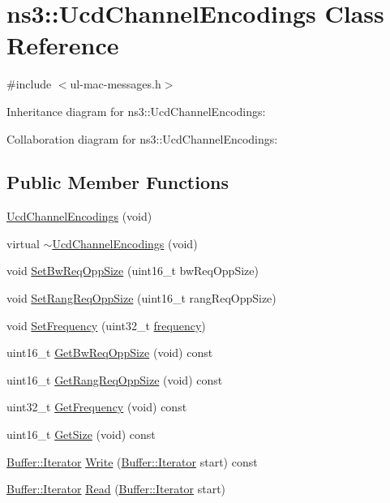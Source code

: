 \hypertarget{classns3_1_1UcdChannelEncodings}{}\section{ns3\+:\+:Ucd\+Channel\+Encodings Class Reference}
\label{classns3_1_1UcdChannelEncodings}


{\ttfamily \#include $<$ul-\/mac-\/messages.\+h$>$}



Inheritance diagram for ns3\+:\+:Ucd\+Channel\+Encodings\+:


Collaboration diagram for ns3\+:\+:Ucd\+Channel\+Encodings\+:
\subsection*{Public Member Functions}
\begin{DoxyCompactItemize}
\item 
\hyperlink{classns3_1_1UcdChannelEncodings_a4f117c27f4a95ee1a3256cb7da02eb64}{Ucd\+Channel\+Encodings} (void)
\item 
virtual \hyperlink{classns3_1_1UcdChannelEncodings_ac2d9ffeae54ebe25d204a858124b40b0}{$\sim$\+Ucd\+Channel\+Encodings} (void)
\item 
void \hyperlink{classns3_1_1UcdChannelEncodings_abf807ce9eab9d2320950a2519049b989}{Set\+Bw\+Req\+Opp\+Size} (uint16\+\_\+t bw\+Req\+Opp\+Size)
\item 
void \hyperlink{classns3_1_1UcdChannelEncodings_a047c31196baed670a0057935d5736205}{Set\+Rang\+Req\+Opp\+Size} (uint16\+\_\+t rang\+Req\+Opp\+Size)
\item 
void \hyperlink{classns3_1_1UcdChannelEncodings_a05720d5a54aec62a0efd537409ecce83}{Set\+Frequency} (uint32\+\_\+t \hyperlink{mmwave_2model_2fading-traces_2fading__trace__generator_8m_a09045328d6d7e16aa4013f526cc6993d}{frequency})
\item 
uint16\+\_\+t \hyperlink{classns3_1_1UcdChannelEncodings_a192a6f870bc66fab3fcb0fa79ea2dd8b}{Get\+Bw\+Req\+Opp\+Size} (void) const 
\item 
uint16\+\_\+t \hyperlink{classns3_1_1UcdChannelEncodings_a27d75585bcae3837f08a4220f1d5eba4}{Get\+Rang\+Req\+Opp\+Size} (void) const 
\item 
uint32\+\_\+t \hyperlink{classns3_1_1UcdChannelEncodings_a973f24e046c5c31ae98ce95ba314e022}{Get\+Frequency} (void) const 
\item 
uint16\+\_\+t \hyperlink{classns3_1_1UcdChannelEncodings_ae59887634315a24269d3b34093633860}{Get\+Size} (void) const 
\item 
\hyperlink{classns3_1_1Buffer_1_1Iterator}{Buffer\+::\+Iterator} \hyperlink{classns3_1_1UcdChannelEncodings_a305d7063870904303611ac17cca5de9d}{Write} (\hyperlink{classns3_1_1Buffer_1_1Iterator}{Buffer\+::\+Iterator} start) const 
\item 
\hyperlink{classns3_1_1Buffer_1_1Iterator}{Buffer\+::\+Iterator} \hyperlink{classns3_1_1UcdChannelEncodings_ab4bf0ada0156e96466807d97b22b233a}{Read} (\hyperlink{classns3_1_1Buffer_1_1Iterator}{Buffer\+::\+Iterator} start)
\end{DoxyCompactItemize}
